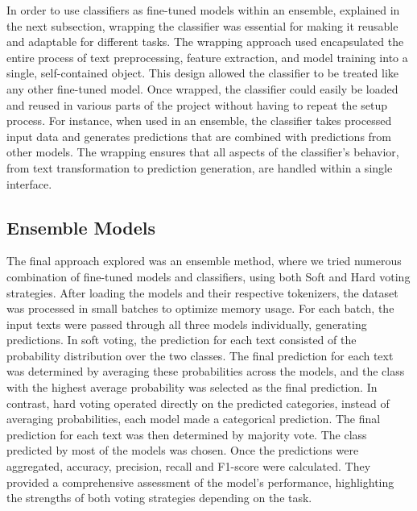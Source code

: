 \documentclass{Configuration_Files/PoliMi3i_thesis}
\begin{document}
In order to use classifiers as fine-tuned models within an ensemble, explained in the next subsection, wrapping the classifier was essential for making it reusable and adaptable for different tasks. The wrapping approach used encapsulated the entire process of text preprocessing, feature extraction, and model training into a single, self-contained object. This design allowed the classifier to be treated like any other fine-tuned model. Once wrapped, the classifier could easily be loaded and reused in various parts of the project without having to repeat the setup process. For instance, when used in an ensemble, the classifier takes processed input data and generates predictions that are combined with predictions from other models. The wrapping ensures that all aspects of the classifier’s behavior, from text transformation to prediction generation, are handled within a single interface.

\subsection{Ensemble Models} \label{sec:ensemble_models}
The final approach explored was an ensemble method, where we tried numerous combination of fine-tuned models and classifiers, using both Soft and Hard voting strategies. After loading the models and their respective tokenizers, the dataset was processed in small batches to optimize memory usage. For each batch, the input texts were passed through all three models individually, generating predictions. In soft voting, the prediction for each text consisted of the probability distribution over the two classes. The final prediction for each text was determined by averaging these probabilities across the models, and the class with the highest average probability was selected as the final prediction. In contrast, hard voting operated directly on the predicted categories, instead of averaging probabilities, each model made a categorical prediction. The final prediction for each text was then determined by majority vote. The class predicted by most of the models was chosen.
Once the predictions were aggregated, accuracy, precision, recall and F1-score were calculated. They provided a comprehensive assessment of the model's performance, highlighting the strengths of both voting strategies depending on the task.
\end{document}
